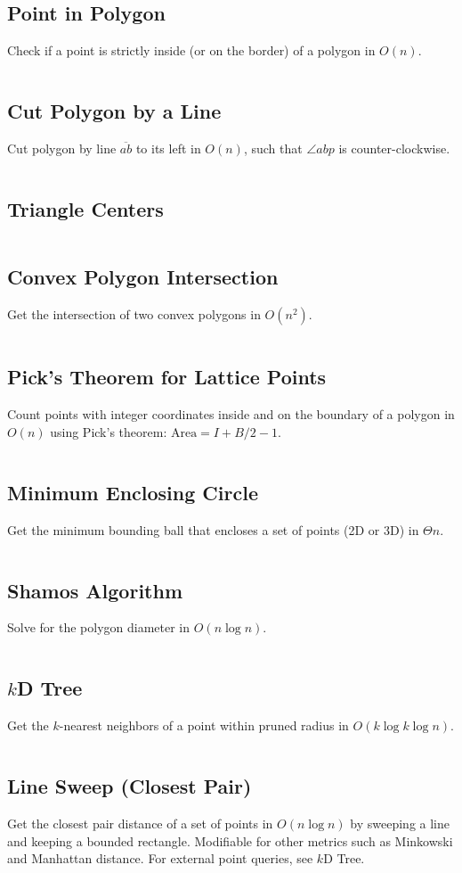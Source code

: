 \documentclass[8pt,a4paper,landscape,oneside]{amsart}
\newcommand{\code}[1]{\inputminted[fontsize=\normalsize,baselinestretch=1]{cpp}{_code/#1}}
\begin{document}
\begin{multicols*}{3}
  \subsection{Point in Polygon}
    Check if a point is strictly inside (or on the border) of a polygon in $O(n)$.
    \code{geom/pt-in-poly.cpp}
  \subsection{Cut Polygon by a Line}
    Cut polygon by line $\overline{ab}$ to its left in $O(n)$, such that $\angle abp$ is counter-clockwise.
    \code{geom/cut-poly.cpp}
  \subsection{Triangle Centers}
    \code{geom/tri-centers.cpp}
  \subsection{Convex Polygon Intersection}
    Get the intersection of two convex polygons in $O(n^2)$.
    \code{geom/convex-poly-isect.cpp}
  \subsection{Pick's Theorem for Lattice Points}
    Count points with integer coordinates inside and on the boundary of a polygon in
    $O(n)$ using Pick's theorem: $\text{Area} = I + B/2 - 1$.
    \code{geom/picks.cpp}
  \subsection{Minimum Enclosing Circle}
    Get the minimum bounding ball that encloses a set of points (2D or 3D) in $\Theta{n}$.
    \code{geom/min-enclosing-circ.cpp}
  \subsection{Shamos Algorithm}
    Solve for the polygon diameter in $O(n \log n)$.
    \code{geom/shamos.cpp}
  \subsection{$k$D Tree}
    Get the $k$-nearest neighbors of a point within pruned radius in $O(k \log k \log n)$.
    \code{geom/kd-tree.cpp}
  \subsection{Line Sweep (Closest Pair)}
    Get the closest pair distance of a set of points in $O(n \log n)$ by sweeping a line and
    keeping a bounded rectangle. Modifiable for other metrics such as Minkowski and
    Manhattan distance. For external point queries, see $k$D Tree.
    \code{geom/closest-pair.cpp}

\end{multicols*}
\end{document}
